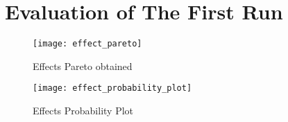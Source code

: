 \newpage
\section{Evaluation of The First Run}
\begin{figure}[H]
	\begin{center}
		\texttt{[image: effect\_pareto]}
	\end{center}
	\caption{Effects Pareto obtained}
\end{figure}


\begin{figure}[H]
	\begin{center}
		\texttt{[image: effect\_probability\_plot]}
	\end{center}
	\caption{Effects Probability Plot}
\end{figure}
